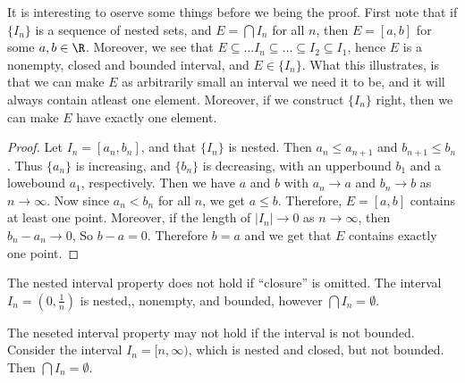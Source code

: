 It is interesting to oserve some things before we being the proof. First note 
that if $\{I_n\}$ is a sequence of nested sets, and  $E=\bigcap I_n$ for all  
$n$, then $E=[a,b]$ for some  $a,b \in \R$. Moreover, we see that  $E \subseteq 
\dots I_n \subseteq \dots \subseteq I_2 \subseteq I_1$, hence $E$ is a nonempty, 
closed and bounded interval, and  $E \in \{I_n\}$. What this illustrates, is 
that we can make  $E$ as arbitrarily small an interval we need it to be, and it 
will always contain atleast one element. Moreover, if we construct $\{I_n\}$ 
right, then we can make $E$ have exactly one element.

\begin{proof}
    Let $I_n=[a_n,b_n]$, and that  $\{I_n\}$ is nested. Then  $a_n \leq a_{n+1}$ 
    and $b_{n+1} \leq b_n$. Thus  $\{a_n\}$ is increasing, and $\{b_n\}$ is 
    decreasing, with an upperbound $b_1$ and a lowebound  $a_1$, respectively. 
    Then we have  $a$ and  $b$ with $a_n \rightarrow a$ and  $b_n \rightarrow b$ 
     as $n \rightarrow \infty$. Now since  $a_n<b_n$ for all  $n$, we get  
     $a \leq b$. Therefore, $E=[a,b]$ contains at least one point. Moreover, if 
     the length of  $|I_n| \rightarrow 0$ as  $n \rightarrow \infty$, then 
     $b_n-a_n \rightarrow 0$, So  $b-a=0$. Therefore  $b=a$ and we get that  $E$ 
     contains exactly one point.
\end{proof}

\begin{remark} 
    The nested interval property does not hold if ``closure'' is omitted. The 
    interval $I_n=(0,\frac{1}{n})$ is nested,, nonempty, and bounded, however 
    $\bigcap I_n = \emptyset$.

\end{remark}

\begin{remark} 
    The neseted interval property may not hold if the interval is not bounded. 
    Consider the interval $I_n=[n,\infty)$, which is nested and closed, but not 
    bounded. Then  $\bigcap I_n=\emptyset$.
\end{remark}

